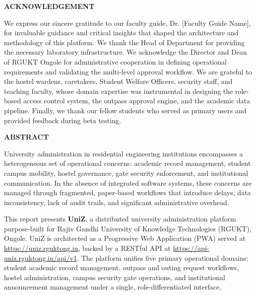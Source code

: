 \documentclass[12pt,a4paper]{report}
\begin{document}
\newpage\thispagestyle{empty}
\begin{center}{\LARGE \textbf{ACKNOWLEDGEMENT}}\end{center}\vspace{0.8cm}
\noindent We express our sincere gratitude to our faculty guide, Dr. [Faculty Guide Name], for invaluable guidance and critical insights that shaped the architecture and methodology of this platform. We thank the Head of Department for providing the necessary laboratory infrastructure. We acknowledge the Director and Dean of RGUKT Ongole for administrative cooperation in defining operational requirements and validating the multi-level approval workflow. We are grateful to the hostel wardens, caretakers, Student Welfare Officers, security staff, and teaching faculty, whose domain expertise was instrumental in designing the role-based access control system, the outpass approval engine, and the academic data pipeline. Finally, we thank our fellow students who served as primary users and provided feedback during beta testing.

\newpage\thispagestyle{empty}
\begin{center}{\LARGE \textbf{ABSTRACT}}\end{center}\vspace{0.8cm}

\noindent University administration in residential engineering institutions encompasses a heterogeneous set of operational concerns: academic record management, student campus mobility, hostel governance, gate security enforcement, and institutional communication. In the absence of integrated software systems, these concerns are managed through fragmented, paper-based workflows that introduce delays, data inconsistency, lack of audit trails, and significant administrative overhead.

\vspace{0.4cm}
\noindent This report presents \textbf{UniZ}, a distributed university administration platform purpose-built for Rajiv Gandhi University of Knowledge Technologies (RGUKT), Ongole. UniZ is architected as a Progressive Web Application (PWA) served at \url{https://uniz.rguktong.in}, backed by a RESTful API at \url{https://api-uniz.rguktong.in/api/v1}. The platform unifies five primary operational domains: student academic record management, outpass and outing request workflows, hostel administration, campus security gate operations, and institutional announcement management under a single, role-differentiated interface.
\end{document}
